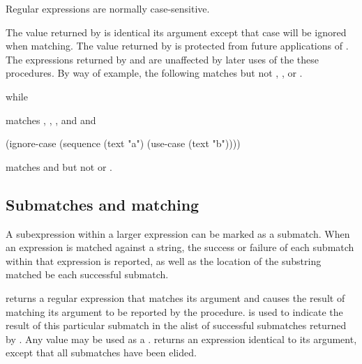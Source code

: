 Regular expressions are normally case-sensitive.
\begin{protos}
\end{protos}
\noindent
The value returned by
  is identical its argument except that case will be
 ignored when matching.
The value returned by  is protected
 from future applications of .
The expressions returned
 by  and  are unaffected by later uses of the
 these procedures.
By way of example, the following matches  but not ,
 , or .
\begin{example}
\end{example}
\noindent
while
\begin{example}
\end{example}
\noindent
matches , ,
 , and  and
\begin{example}
(ignore-case (sequence (text "a")
                       (use-case (text "b"))))
\end{example}
\noindent
matches  and  but not  or .

\subsection{Submatches and matching}

A subexpression within a larger expression can be marked as a submatch.
When an expression is matched against a string, the success or failure
of each submatch within that expression is reported, as well as the
location of the substring matched be each successful submatch.

\begin{protos}
\end{protos}
\noindent
{} returns a regular expression that matches its argument and
 causes the result of matching its argument to be reported by the 
 procedure.
 is used to indicate the result of this particular submatch 
 in the alist of successful submatches returned by .
 Any value may be used as a .
 returns an expression identical to its
 argument, except that all submatches have been elided.

